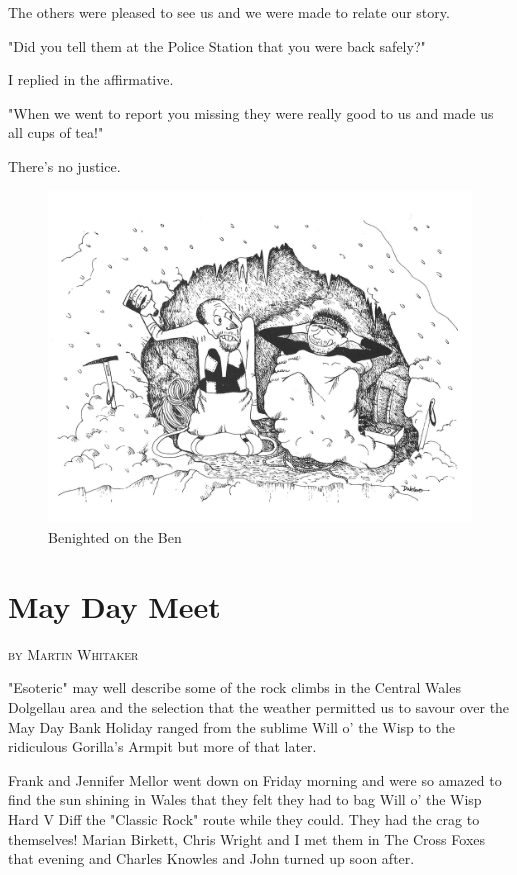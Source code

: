 \documentclass[a5paper,openany,font 10pt]{scrbook}
\makeatletter
\newcommand{\chapterauthor}[1]{%
{\parindent0pt\vspace*{-5pt}%
\linespread{1.1}\large\scshape#1%
\par\nobreak\vspace*{35pt}}
\@afterheading%
}
\makeatother
\begin{document}
The others were pleased to see us and we were made to relate
our story.

"Did you tell them at the Police Station that you were back
safely?"

I replied in the affirmative.

"When we went to report you missing they were really good to
us and made us all cups of tea!"

There's no justice.
\begin{figure}[htb]
\centering
\includegraphics[width=.9\linewidth]{./images/Cartoon_05.jpg}
\caption{\label{fig:orgd909c26}
Benighted on the Ben}
\end{figure}

\chapter{May Day Meet}
\label{sec:orga665025}
\chapterauthor{by Martin Whitaker}

"Esoteric" may well describe some of the rock climbs in the
Central Wales Dolgellau area and the selection that the weather
permitted us to savour over the May Day Bank Holiday ranged from
the sublime   Will o' the Wisp   to the ridiculous   Gorilla's
Armpit     but more of that later.

Frank and Jennifer Mellor went down on Friday morning and
were so amazed to find the sun shining in Wales that they felt
they had to bag  Will o' the Wisp   Hard V Diff   the "Classic
Rock" route  while they could. They had the crag to themselves!
Marian Birkett, Chris Wright and I met them in The Cross Foxes
that evening and Charles Knowles and John turned up soon after.
\end{document}
